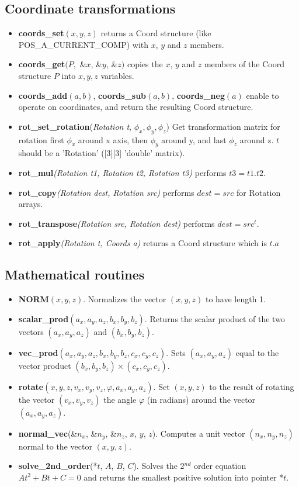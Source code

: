 \subsection{Coordinate transformations}
\begin{itemize}
\item {\bf coords\_set}$(x,y,z)$ returns a Coord structure (like POS\_A\_CURRENT\_COMP) with $x$, $y$ and $z$ members.
\item {\bf  coords\_get}$(P,$ \&$x$, \&$y$, \&$z)$ copies the $x$, $y$ and
$z$ members of the Coord structure $P$ into $x,y,z$ variables.
\item {\bf coords\_add}$(a,b)$, {\bf coords\_sub}$(a,b)$, {\bf
coords\_neg}$(a)$ enable to  operate on coordinates, and return the
resulting Coord structure.
\item {\bf rot\_set\_rotation}({\it Rotation t}, $\phi_x, \phi_y, \phi_z$)
  Get transformation matrix for rotation
  first $\phi_x$ around x axis, then $\phi_y$ around y,
  and last $\phi_z$ around z. $t$ should be a 'Rotation' ([3][3] 'double' matrix).
\item {\bf rot\_mul}{\it (Rotation t1, Rotation t2, Rotation t3)} performs $t3 = t1 . t2$.
\item {\bf rot\_copy}{\it (Rotation dest, Rotation src)} performs $dest = src$ for Rotation arrays.
\item {\bf rot\_transpose}{\it (Rotation src, Rotation dest)} performs $dest = src^t$.
\item {\bf rot\_apply}{\it (Rotation t, Coords a)} returns a Coord structure which is $t.a$
\end{itemize}

\subsection{Mathematical routines}
\begin{itemize}
\item {\bf NORM}$(x,y,z)$. Normalizes the vector $(x,y,z)$ to have
  length 1.
\item {\bf scalar\_prod}$(a_x,a_y,a_z,b_x,b_y,b_z)$. Returns the scalar
  product of the two vectors $(a_x,a_y,a_z)$ and $(b_x,b_y,b_z)$.
\item {\bf vec\_prod}$(a_x,a_y,a_z,b_x,b_y,b_z, c_x,c_y,c_z)$. Sets
  $(a_x,a_y,a_z)$ equal to the vector product $(b_x,b_y,b_z) \times (c_x,c_y,c_z)$.
\item {\bf rotate}$(x,y,z,v_x,v_y,v_z,\varphi,a_x,a_y,a_z)$. Set
  $(x,y,z)$ to the result of rotating the vector $(v_x,v_y,v_z)$
  the angle $\varphi$ (in radians) around the vector $(a_x,a_y,a_z)$.
\item {\bf normal\_vec}(\&$n_x$, \&$n_y$, \&$n_z$, $x$, $y$, $z$).
  Computes a unit vector $(n_x, n_y, n_z)$ normal to the vector
  $(x,y,z)$.
\item {\bf solve\_2nd\_order}(*$t$, $A$,  $B$,  $C$).
  Solves the 2$^{nd}$ order equation $At^2 + Bt + C = 0$ and returns
  the smallest positive solution into pointer *$t$.
\end{itemize}

